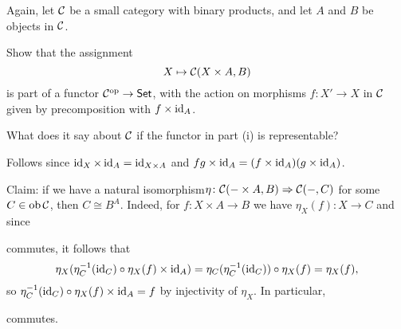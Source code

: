 \begin{exercise}{58}
    Again, let $\mathcal{C}$ be a small category with binary products, and let $A$ and $B$ be objects in $\mathcal{C}$.
    \begin{exercises}
        \item Show that the assignment 
            \[ X\mapsto \mathcal{C}(X\times A, B) \]
            is part of a functor $\mathcal{C}^{\text{op}}\to\normalfont\mathsf{Set}$, with the action on morphisms $f\colon X'\to X$ in $\mathcal{C}$ given by precomposition with $f\times \operatorname{id}_A$.
        \item What does it say about $\mathcal{C}$ if the functor in part (i) is representable?
    \end{exercises}
\end{exercise}
\begin{solution}
    \begin{exercises}
        \item Follows since $\operatorname{id}_X\times\operatorname{id}_A=\operatorname{id}_{X\times A}$ and $fg\times\operatorname{id}_A=(f\times\operatorname{id}_A)(g\times\operatorname{id}_A)$.
        \item Claim: if we have a natural isomorphism$\eta\colon\mathcal{C}(-\times A,B)\Rightarrow\mathcal{C}(-, C)$ for some $C\in\operatorname{ob}\mathcal{C}$, then $C\cong B^A$.
            Indeed, for $f\colon X\times A\to B$ we have $\eta_X(f)\colon X\to C$ and since
            \begin{center}
            \end{center}
            commutes, it follows that
            \[ \eta_X(\eta_C^{-1}(\operatorname{id}_C)\circ \eta_X(f)\times\operatorname{id}_A)=\eta_C(\eta_C^{-1}(\operatorname{id}_C))\circ\eta_X(f)=\eta_X(f),\]
            so $\eta_C^{-1}(\operatorname{id}_C)\circ \eta_X(f)\times\operatorname{id}_A=f$ by injectivity of $\eta_X$. In particular,
            \begin{center}
            \end{center}
            commutes. 
    \end{exercises}
\end{solution}

